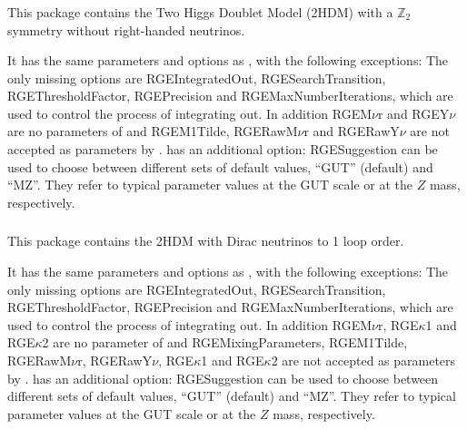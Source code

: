 \documentclass[10pt,a4paper,twoside]{scrartcl}
\begin{document}
  

\subsubsection[\package{RGE2HDM0N}]{}
This package contains the Two Higgs Doublet Model (2HDM) with a $\mathbb{Z}_2$
symmetry without right-handed neutrinos.

\vspace{2ex} It has the same parameters and options as
, with the following exceptions:  The
only missing options are RGEIntegratedOut, RGESearchTransition,
RGEThresholdFactor, RGEPrecision and RGEMaxNumberIterations, which are used to
control the process of integrating out.  In addition RGEM$\nu$r and RGEY$\nu$
are no parameters of  and RGEM1Tilde, RGERawM$\nu$r and RGERawY$\nu$
are not accepted as parameters by .
 has an additional option: RGESuggestion can be
used to choose between different sets of default values, ``GUT''
(default) and ``MZ''.  They refer to typical parameter values at the GUT
scale or at the $Z$ mass, respectively.


\subsubsection[\package{RGE2HDMDirac}]{}
This package contains the 2HDM with Dirac neutrinos to 1 loop order.

\vspace{2ex} It has the same parameters and options as
, with the following exceptions: The
only missing options are RGEIntegratedOut, RGESearchTransition,
RGEThresholdFactor, RGEPrecision and RGEMaxNumberIterations, which are used to
control the process of integrating out.  In addition RGEM$\nu$r, RGE$\kappa$1
and RGE$\kappa$2 are no parameter of  and
RGEMixingParameters, RGEM1Tilde, RGERawM$\nu$r,
RGERawY$\nu$, RGE$\kappa$1 and RGE$\kappa$2 are not accepted as parameters by
.
 has an additional option: RGESuggestion can be
used to choose between different sets of default values, ``GUT''
(default) and ``MZ''.  They refer to typical parameter values at the GUT
scale or at the $Z$ mass, respectively.


%
%






\end{document}
